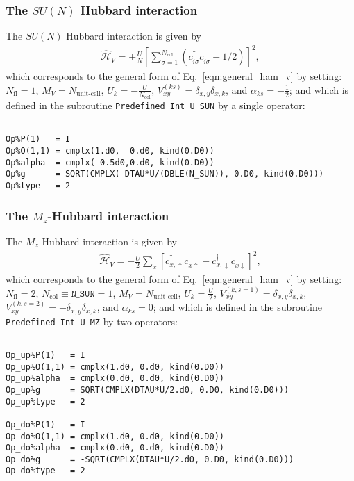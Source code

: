 \subsubsection{The $SU(N)$ Hubbard interaction}

The $SU(N)$ Hubbard interaction is given by 
\begin{align}
\hat{\mathcal{H}}_{V} =
+ \frac{U}{N}\left[
\sum\limits_{\sigma=1}^{N_{\mathrm{col}}}
\left(  c^{\dagger}_{i \sigma} c^{\phantom\dagger}_{i \sigma}  -1/2 \right) \right]^{2},
\end{align} 
which corresponds to the general form of Eq.~\eqref{eqn:general_ham_v} by setting: 
$N_{\mathrm{fl}} = 1$,  $M_V = N_{\text{unit-cell}} $,  $U_{k} =  -\frac{U}{N_{\mathrm{col}}}$,  $V_{x y}^{(ks)} =  \delta_{x,y} \delta_{x,k}$, and $\alpha_{ks} = -\frac{1}{2}$; and which is defined in the subroutine \texttt{Predefined\_Int\_U\_SUN} by a single operator:
\begin{lstlisting}[style=fortran]

Op%P(1)   = I
Op%O(1,1) = cmplx(1.d0,  0.d0, kind(0.D0))
Op%alpha  = cmplx(-0.5d0,0.d0, kind(0.D0))
Op%g      = SQRT(CMPLX(-DTAU*U/(DBLE(N_SUN)), 0.D0, kind(0.D0))) 
Op%type   = 2

\end{lstlisting}


\subsubsection{The $M_z$-Hubbard interaction}

The $M_z$-Hubbard interaction is given by 
\begin{align}
\hat{\mathcal{H}}_{V} = - \frac{U}{2}\sum\limits_{x}\left[
c^{\dagger}_{x, \uparrow} c^{\phantom\dagger}_{x \uparrow}  -   c^{\dagger}_{x, \downarrow} c^{\phantom\dagger}_{x \downarrow}  \right]^{2},
\end{align} 
which corresponds to the general form of Eq.~\eqref{eqn:general_ham_v} by setting: 
$N_{\mathrm{fl}} = 2$, $N_{\mathrm{col}} \equiv \texttt{N\_SUN} =1 $,  $M_V =  N_{\text{unit-cell}} $,  $U_{k} = \frac{U}{2}$, 
$V_{x y}^{(k, s=1)} =  \delta_{x,y} \delta_{x,k}  $,  $V_{x y}^{(k, s=2)} =  - \delta_{x,y} \delta_{x,k}  $, and $\alpha_{ks}   = 0  $; and which is defined in the subroutine \texttt{Predefined\_Int\_U\_MZ} by two operators:
\begin{lstlisting}[style=fortran]
        
Op_up%P(1)   = I
Op_up%O(1,1) = cmplx(1.d0, 0.d0, kind(0.D0))
Op_up%alpha  = cmplx(0.d0, 0.d0, kind(0.D0))
Op_up%g      = SQRT(CMPLX(DTAU*U/2.d0, 0.D0, kind(0.D0))) 
Op_up%type   = 2

Op_do%P(1)   = I
Op_do%O(1,1) = cmplx(1.d0, 0.d0, kind(0.D0))
Op_do%alpha  = cmplx(0.d0, 0.d0, kind(0.D0))
Op_do%g      = -SQRT(CMPLX(DTAU*U/2.d0, 0.D0, kind(0.D0))) 
Op_do%type   = 2

\end{lstlisting}


